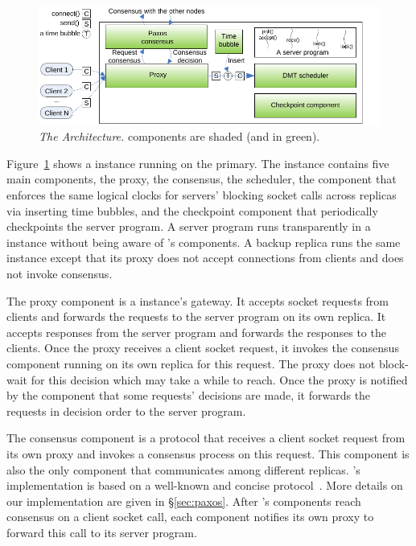 \begin{figure}[t]
\centering
\includegraphics[width=.5\textwidth]{figures/repbox}
\vspace{-.20in}
\caption{{\em The \xxx Architecture.} \xxx components are shaded (and in
  green).} \label{fig:repbox}
\vspace{-.05in}
\end{figure}

Figure~\ref{fig:repbox} shows a \xxx instance running on the primary. The 
instance contains five main components, the proxy, the 
\paxos consensus, the \dmt scheduler, the \timealgo component that enforces the 
same logical clocks for servers' blocking socket calls across
replicas via inserting time bubbles, and the checkpoint component that 
periodically checkpoints the server program. A server program runs 
transparently in a \xxx instance without being aware of \xxx's components. A 
backup replica runs the same \xxx instance except that its proxy does not 
accept connections from clients and does not invoke consensus.

The proxy component is a \xxx instance's gateway.  It accepts socket
requests from clients and forwards the requests to the server program on its 
own replica. It accepts responses from the server program and forwards the 
responses to the clients. Once the proxy receives a
client socket request, it invokes the \paxos consensus component running
on its own replica for this request.  The proxy does not block-wait for 
this decision which may take a while to reach. Once the proxy is notified by 
the \paxos component that some requests' decisions are made, it forwards the 
requests in decision order to the server program.


The \paxos consensus component is a \paxos protocol that receives a client 
socket request from its own proxy and invokes a consensus process on
this request.  This component is also the only \xxx component that
communicates among different replicas. \xxx's \paxos implementation is 
based on a well-known and concise protocol~\cite{paxos:practical}. More
details on our \paxos implementation are given in \S\ref{sec:paxos}. After
\xxx's \paxos components reach consensus on a client socket call, each \paxos 
component notifies its own proxy to forward this call to its server program.

